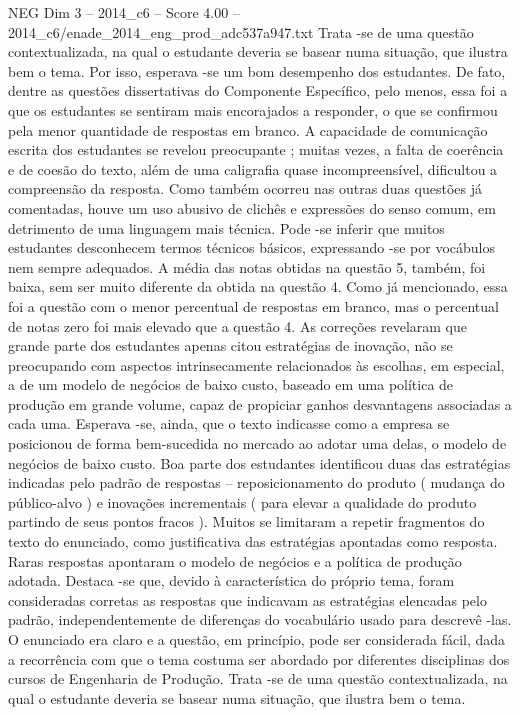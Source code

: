 \begin{textsample}{NEG Dim 3 – 2014\_c6 – Score 4.00 – 2014\_c6/enade\_2014\_eng\_prod\_adc537a947.txt}
Trata -se de uma questão contextualizada, na qual o estudante deveria se basear numa situação, que ilustra bem o tema.
Por isso, esperava -se um bom desempenho dos estudantes.
De fato, dentre as questões dissertativas do Componente Específico, pelo menos, essa foi a que os estudantes se sentiram mais encorajados a responder, o que se confirmou pela menor quantidade de respostas em branco.
A capacidade de comunicação escrita dos estudantes se revelou preocupante ; muitas vezes, a falta de coerência e de coesão do texto, além de uma caligrafia quase incompreensível, dificultou a compreensão da resposta.
Como também ocorreu nas outras duas questões já comentadas, houve um uso abusivo de clichês e expressões do senso comum, em detrimento de uma linguagem mais técnica.
Pode -se inferir que muitos estudantes desconhecem termos técnicos básicos, expressando -se por vocábulos nem sempre adequados.
A média das notas obtidas na questão 5, também, foi baixa, sem ser muito diferente da obtida na questão 4.
Como já mencionado, essa foi a questão com o menor percentual de respostas em branco, mas o percentual de notas zero foi mais elevado que a questão 4.
As correções revelaram que grande parte dos estudantes apenas citou estratégias de inovação, não se preocupando com aspectos intrinsecamente relacionados às escolhas, em especial, a de um modelo de negócios de baixo custo, baseado em uma política de produção em grande volume, capaz de propiciar ganhos desvantagens associadas a cada uma.
Esperava -se, ainda, que o texto indicasse como a empresa se posicionou de forma bem-sucedida no mercado ao adotar uma delas, o modelo de negócios de baixo custo.
Boa parte dos estudantes identificou duas das estratégias indicadas pelo padrão de respostas – reposicionamento do produto ( mudança do público-alvo ) e inovações incrementais ( para elevar a qualidade do produto partindo de seus pontos fracos ).
Muitos se limitaram a repetir fragmentos do texto do enunciado, como justificativa das estratégias apontadas como resposta.
Raras respostas apontaram o modelo de negócios e a política de produção adotada.
Destaca -se que, devido à característica do próprio tema, foram consideradas corretas as respostas que indicavam as estratégias elencadas pelo padrão, independentemente de diferenças do vocabulário usado para descrevê -las.
O enunciado era claro e a questão, em princípio, pode ser considerada fácil, dada a recorrência com que o tema costuma ser abordado por diferentes disciplinas dos cursos de Engenharia de Produção.
Trata -se de uma questão contextualizada, na qual o estudante deveria se basear numa situação, que ilustra bem o tema.

\end{textsample}
